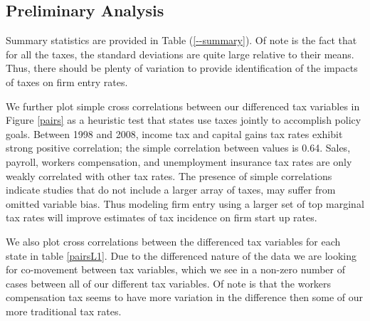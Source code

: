 \subsection{Preliminary Analysis}

Summary statistics are provided in Table (\ref{--summary}). Of note is the fact that for all the taxes, the standard deviations are quite large relative to their means. Thus, there should be plenty of variation to provide identification of the impacts of taxes on firm entry rates.

We further plot simple cross correlations between our differenced tax variables in Figure \ref{pairs} as a heuristic test that states use taxes jointly to accomplish policy goals. Between 1998 and 2008, income tax and capital gains tax rates exhibit strong positive correlation; the simple correlation between values is 0.64. Sales, payroll, workers compensation, and unemployment insurance tax rates are only weakly correlated with other tax rates. The presence of simple correlations indicate studies that do not include a larger array of taxes, may suffer from omitted variable bias. Thus modeling firm entry using a larger set of top marginal tax rates will improve estimates of tax incidence on firm start up rates.

We also plot cross correlations between the differenced tax variables for each state in table \ref{pairsL1}. Due to the differenced nature of the data we are looking for co-movement between tax variables, which we see in a non-zero number of cases between all of our different tax variables. Of note is that the workers compensation tax seems to have more variation in the difference then some of our more traditional tax rates.